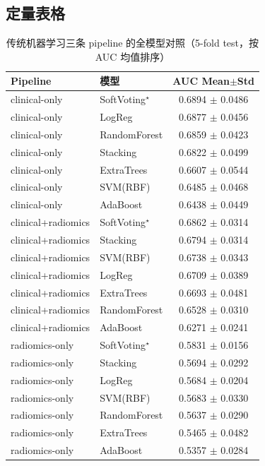 \documentclass[12pt,a4paper]{ctexart}
\begin{document}
\subsection{定量表格}
\begin{table}[H]
\centering
\caption{传统机器学习三条 pipeline 的全模型对照（5-fold test，按 AUC 均值排序）}
\begin{tabular}{llc}
\toprule
Pipeline & 模型 & AUC Mean$\pm$Std \\
\midrule
clinical-only & SoftVoting$^\star$ & 0.6894 $\pm$ 0.0486 \\
clinical-only & LogReg & 0.6877 $\pm$ 0.0456 \\
clinical-only & RandomForest & 0.6859 $\pm$ 0.0423 \\
clinical-only & Stacking & 0.6822 $\pm$ 0.0499 \\
clinical-only & ExtraTrees & 0.6607 $\pm$ 0.0544 \\
clinical-only & SVM(RBF) & 0.6485 $\pm$ 0.0468 \\
clinical-only & AdaBoost & 0.6438 $\pm$ 0.0449 \\
\midrule
clinical+radiomics & SoftVoting$^\star$ & 0.6862 $\pm$ 0.0314 \\
clinical+radiomics & Stacking & 0.6794 $\pm$ 0.0314 \\
clinical+radiomics & SVM(RBF) & 0.6738 $\pm$ 0.0343 \\
clinical+radiomics & LogReg & 0.6709 $\pm$ 0.0389 \\
clinical+radiomics & ExtraTrees & 0.6693 $\pm$ 0.0481 \\
clinical+radiomics & RandomForest & 0.6528 $\pm$ 0.0310 \\
clinical+radiomics & AdaBoost & 0.6271 $\pm$ 0.0241 \\
\midrule
radiomics-only & SoftVoting$^\star$ & 0.5831 $\pm$ 0.0156 \\
radiomics-only & Stacking & 0.5694 $\pm$ 0.0292 \\
radiomics-only & LogReg & 0.5684 $\pm$ 0.0204 \\
radiomics-only & SVM(RBF) & 0.5683 $\pm$ 0.0330 \\
radiomics-only & RandomForest & 0.5637 $\pm$ 0.0290 \\
radiomics-only & ExtraTrees & 0.5465 $\pm$ 0.0482 \\
radiomics-only & AdaBoost & 0.5357 $\pm$ 0.0284 \\
\bottomrule
\end{tabular}
\end{table}
\end{document}
